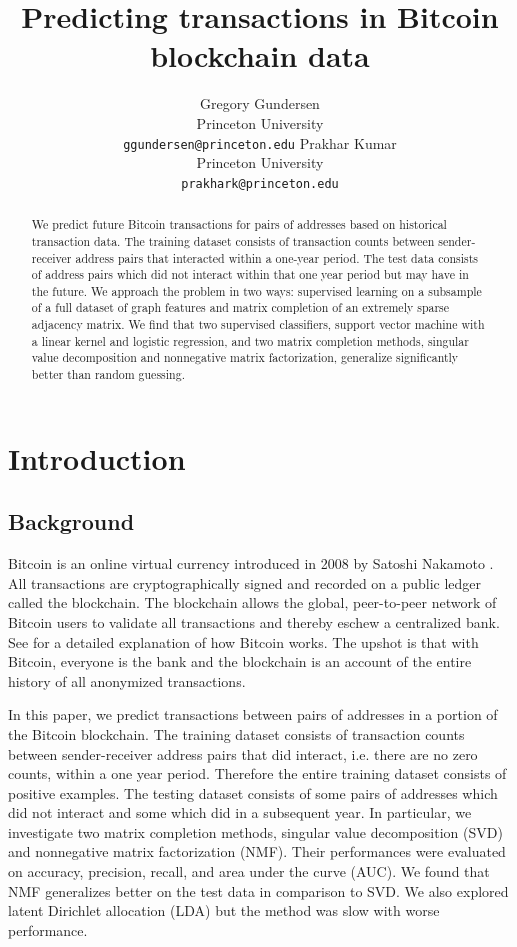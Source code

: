 \documentclass{article} %
\title{Predicting transactions in Bitcoin blockchain data}
\author{
Gregory Gundersen\\
Princeton University\\
\texttt{ggundersen@princeton.edu}
\And
Prakhar Kumar \\
Princeton University \\
\texttt{prakhark@princeton.edu} \\
}
\begin{document}
\maketitle

\begin{abstract}
We predict future Bitcoin transactions for pairs of addresses based on historical transaction data. The training dataset consists of transaction counts between sender-receiver address pairs that interacted within a one-year period. The test data consists of address pairs which did not interact within that one year period but may have in the future. We approach the problem in two ways: supervised learning on a subsample of a full dataset of graph features and matrix completion of an extremely sparse adjacency matrix. We find that two supervised classifiers, support vector machine with a linear kernel and logistic regression, and two matrix completion methods, singular value decomposition and nonnegative matrix factorization, generalize significantly better than random guessing.
\end{abstract}

\section{Introduction}

\subsection{Background}

Bitcoin is an online virtual currency introduced in 2008 by Satoshi Nakamoto \cite{nakamoto2008bitcoin}. All transactions are cryptographically signed and recorded on a public ledger called the blockchain. The blockchain allows the global, peer-to-peer network of Bitcoin users to validate all transactions and thereby eschew a centralized bank. See \cite{nielsen2013bitcoin} for a detailed explanation of how Bitcoin works. The upshot is that with Bitcoin, everyone is the bank and the blockchain is an account of the entire history of all anonymized transactions.

In this paper, we predict transactions between pairs of addresses in a portion of the Bitcoin blockchain. The training dataset consists of transaction counts between sender-receiver address pairs that did interact, i.e. there are no zero counts, within a one year period. Therefore the entire training dataset consists of positive examples. The testing dataset consists of some pairs of addresses which did not interact and some which did in a subsequent year. In particular, we investigate two matrix completion methods, singular value decomposition (SVD) and nonnegative matrix factorization (NMF). Their performances were evaluated on accuracy, precision, recall, and area under the curve (AUC). We found that NMF generalizes better on the test data in comparison to SVD. We also explored latent Dirichlet allocation (LDA) but the method was slow with worse performance.
\end{document}
